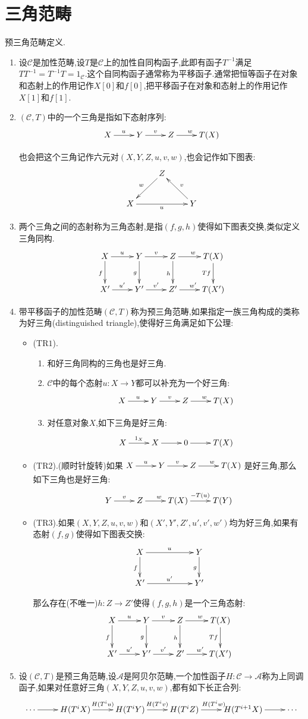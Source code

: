 \section{三角范畴}

预三角范畴定义.
\begin{enumerate}
	\item 设$\mathscr{C}$是加性范畴,设$T$是$\mathscr{C}$上的加性自同构函子,此即有函子$T^{-1}$满足$TT^{-1}=T^{-1}T=1_{\mathscr{C}}$.这个自同构函子通常称为平移函子.通常把恒等函子在对象和态射上的作用记作$X[0]$和$f[0]$,把平移函子在对象和态射上的作用记作$X[1]$和$f[1]$.
	\item $(\mathscr{C},T)$中的一个三角是指如下态射序列:
	$$\xymatrix{X\ar[r]^u&Y\ar[r]^v&Z\ar[r]^w&T(X)}$$
	
	也会把这个三角记作六元对$(X,Y,Z,u,v,w)$,也会记作如下图表:
	$$\xymatrix{&Z\ar[dl]_w&\\X\ar[rr]_u&&Y\ar[ul]_v}$$
	\item 两个三角之间的态射称为三角态射,是指$(f,g,h)$使得如下图表交换,类似定义三角同构.
	$$\xymatrix{X\ar[r]^u\ar[d]_f&Y\ar[r]^v\ar[d]_g&Z\ar[r]^w\ar[d]_h&T(X)\ar[d]_{Tf}\\X'\ar[r]^{u'}&Y'\ar[r]^{v'}&Z'\ar[r]^{w'}&T(X')}$$
	\item 带平移函子的加性范畴$(\mathscr{C},T)$称为预三角范畴,如果指定一族三角构成的类称为好三角(distinguished triangle),使得好三角满足如下公理:
	\begin{itemize}
		\item ($\mathrm{TR}1$).
		\begin{enumerate}
			\item 和好三角同构的三角也是好三角.
			\item $\mathscr{C}$中的每个态射$u:X\to Y$都可以补充为一个好三角:
			$$\xymatrix{X\ar[r]^u&Y\ar[r]^v&Z\ar[r]^w&T(X)}$$
			\item 对任意对象$X$,如下三角是好三角:
			$$\xymatrix{X\ar[r]^{1_X}&X\ar[r]&0\ar[r]&T(X)}$$
		\end{enumerate}
	    \item ($\mathrm{TR}2$).(顺时针旋转)如果$\xymatrix{X\ar[r]^u&Y\ar[r]^v&Z\ar[r]^w&T(X)}$是好三角,那么如下三角也是好三角:
	    $$\xymatrix{Y\ar[r]^v&Z\ar[r]^w&T(X)\ar[r]^{-T(u)}&T(Y)}$$
	    \item ($\mathrm{TR}3$).如果$(X,Y,Z,u,v,w)$和$(X',Y',Z',u',v',w')$均为好三角,如果有态射$(f,g)$使得如下图表交换:
	    $$\xymatrix{X\ar[d]_f\ar[rr]^u&&Y\ar[d]_g\\X'\ar[rr]^{u'}&&Y'}$$
	    
	    那么存在(不唯一)$h:Z\to Z'$使得$(f,g,h)$是一个三角态射:
	    $$\xymatrix{X\ar[r]^u\ar[d]_f&Y\ar[r]^v\ar[d]_g&Z\ar[r]^w\ar[d]_h&T(X)\ar[d]_{Tf}\\X'\ar[r]^{u'}&Y'\ar[r]^{v'}&Z'\ar[r]^{w'}&T(X')}$$
	\end{itemize}
    \item 设$(\mathscr{C},T)$是预三角范畴,设$\mathscr{A}$是阿贝尔范畴,一个加性函子$H:\mathscr{C}\to\mathscr{A}$称为上同调函子,如果对任意好三角$(X,Y,Z,u,v,w)$,都有如下长正合列:
    $$\xymatrix{\cdots\ar[r]&H(T^iX)\ar[r]^{H(T^iu)}&H(T^iY)\ar[r]^{H(T^iv)}&H(T^iZ)\ar[r]^{H(T^iw)}&H(T^{i+1}X)\ar[r]&\cdots}$$
    

\end{enumerate}

